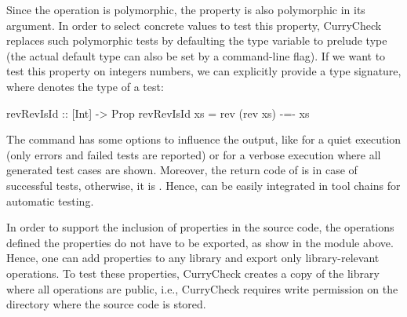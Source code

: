 Since the operation  is polymorphic,
the property  is also polymorphic in its argument.
In order to select concrete values to test this property,
CurryCheck replaces such polymorphic tests by defaulting the type
variable to prelude type 
(the actual default type can also be set by a command-line flag).
If we want to test this property on integers numbers,
we can explicitly provide a type signature,
where  denotes the type of a test:
\begin{curry}
revRevIsId :: [Int] -> Prop
revRevIsId xs = rev (rev xs) -=- xs
\end{curry}
The command  has some options to influence
the output, like  for a quiet execution
(only errors and failed tests are reported) or
 for a verbose execution where all generated test cases
are shown.
Moreover, the return code of  is 
in case of successful tests, otherwise, it is .
Hence,  can be easily integrated in tool chains
for automatic testing.

In order to support the inclusion of properties in the source code,
the operations defined the properties do not have to be exported,
as show in the module  above.
Hence, one can add properties to any library and export only
library-relevant operations. To test these properties,
CurryCheck creates a copy of the library where all operations
are public, i.e., CurryCheck requires write permission on the
directory where the source code is stored.

